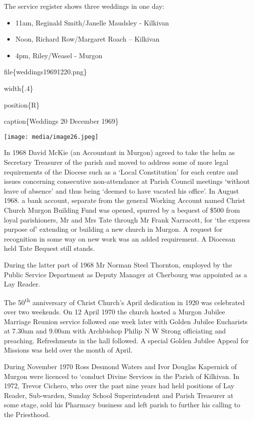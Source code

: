 The service register shows three weddings in one day:

\begin{itemize}
\item
  11am, Reginald Smith/Janelle Maudsley - Kilkivan
\item
  Noon, Richard Row/Margaret Roach -- Kilkivan
\item
  4pm, Riley/Weasel - Murgon
\end{itemize}

file\{weddings19691220.png\}

width\{.4\}

position\{R\}

caption\{Weddings 20 December 1969\}

\texttt{[image: media/image26.jpeg]}

In 1968 David McKie (an Accountant in Murgon) agreed to take the helm as
Secretary Treasurer of the parish and moved to address some of more
legal requirements of the Diocese such as a `Local Constitution' for
each centre and issues concerning consecutive non-attendance at Parish
Council meetings `without leave of absence' and thus being `deemed to
have vacated his office'. In August 1968. a bank account, separate from
the general Working Account named Christ Church Murgon Building Fund was
opened, spurred by a bequest of \$500 from loyal parishioners, Mr and
Mrs Tate through Mr Frank Narracott, for `the express purpose of'
extending or building a new church in Murgon. A request for recognition
in some way on new work was an added requirement. A Diocesan held Tate
Bequest still stands.

During the latter part of 1968 Mr Norman Steel Thornton, employed by the
Public Service Department as Deputy Manager at Cherbourg was appointed
as a Lay Reader.

The 50\textsuperscript{th} anniversary of Christ Church's April
dedication in 1920 was celebrated over two weekends. On 12 April 1970
the church hosted a Murgon Jubilee Marriage Reunion service followed one
week later with Golden Jubilee Eucharists at 7.30am and 9.00am with
Archbishop Philip N W Strong officiating and preaching. Refreshments in
the hall followed. A special Golden Jubilee Appeal for Missions was held
over the month of April.

During November 1970 Ross Desmond Waters and Ivor Douglas Kapernick of
Murgon were licenced to `conduct Divine Services in the Parish of
Kilkivan. In 1972, Trevor Cichero, who over the past nine years had held
positions of Lay Reader, Sub-warden, Sunday School Superintendent and
Parish Treasurer at some stage, sold his Pharmacy business and left
parish to further his calling to the Priesthood.

